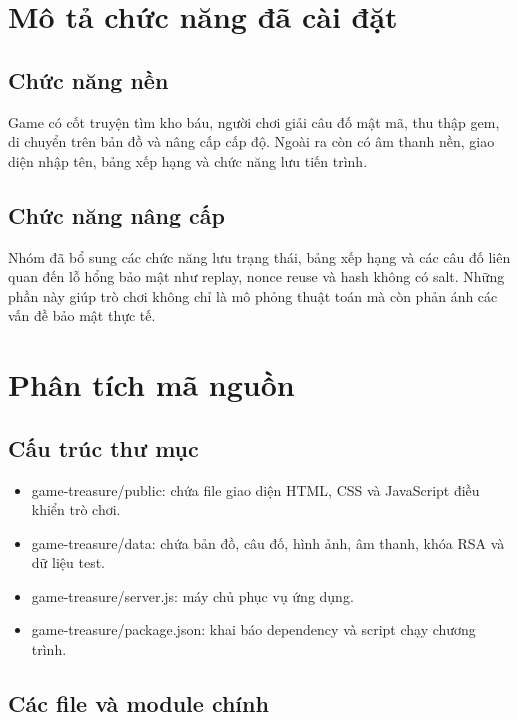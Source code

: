 \section{Mô tả chức năng đã cài đặt}

\subsection{Chức năng nền}

Game có cốt truyện tìm kho báu, người chơi giải câu đố mật mã, thu thập gem, di chuyển trên bản đồ và nâng cấp cấp độ. Ngoài ra còn có âm thanh nền, giao diện nhập tên, bảng xếp hạng và chức năng lưu tiến trình.

\subsection{Chức năng nâng cấp}

Nhóm đã bổ sung các chức năng lưu trạng thái, bảng xếp hạng và các câu đố liên quan đến lỗ hổng bảo mật như replay, nonce reuse và hash không có salt. Những phần này giúp trò chơi không chỉ là mô phỏng thuật toán mà còn phản ánh các vấn đề bảo mật thực tế.

\section{Phân tích mã nguồn}

\subsection{Cấu trúc thư mục}

\begin{itemize}
    \item game-treasure/public: chứa file giao diện HTML, CSS và JavaScript điều khiển trò chơi.
    \item game-treasure/data: chứa bản đồ, câu đố, hình ảnh, âm thanh, khóa RSA và dữ liệu test.
    \item game-treasure/server.js: máy chủ phục vụ ứng dụng.
    \item game-treasure/package.json: khai báo dependency và script chạy chương trình.
\end{itemize}

\subsection{Các file và module chính}

